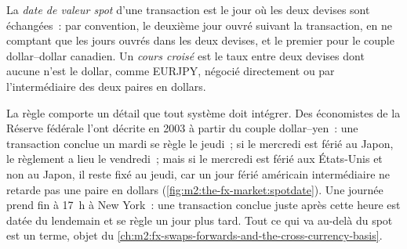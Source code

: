 \begin{definition}\label{def:m2:the-fx-market:spot}
La \emph{date de valeur spot} d'une transaction est le jour où
les deux devises sont échangées~: par convention, le deuxième jour ouvré suivant
la transaction, en ne comptant que les jours ouvrés dans les deux devises, et
le premier pour le couple dollar--dollar canadien. Un \emph{cours croisé} est
le taux entre deux devises dont aucune n'est le dollar, comme EURJPY,
négocié directement ou par l'intermédiaire des deux paires en dollars.
\end{definition}

La règle comporte un détail que tout système doit intégrer. Des économistes de la Réserve fédérale
l'ont décrite en 2003 à partir du couple dollar--yen~: une transaction conclue un mardi se règle
le jeudi~; si le mercredi est férié au Japon, le règlement a lieu le vendredi~; mais si le mercredi est
férié aux États-Unis et non au Japon, il reste fixé au jeudi, car un
jour férié américain intermédiaire ne retarde pas une paire en dollars
(\cref{fig:m2:the-fx-market:spotdate}). Une journée prend fin à 17~h à New York~: une
transaction conclue juste après cette heure est datée du lendemain et se règle un jour plus tard. Tout
ce qui va au-delà du spot est un terme, objet du \cref{ch:m2:fx-swaps-forwards-and-the-cross-currency-basis}.

\begin{omfigure}
\centering
{}

\label{fig:m2:the-fx-market:spotdate}
\end{omfigure}


